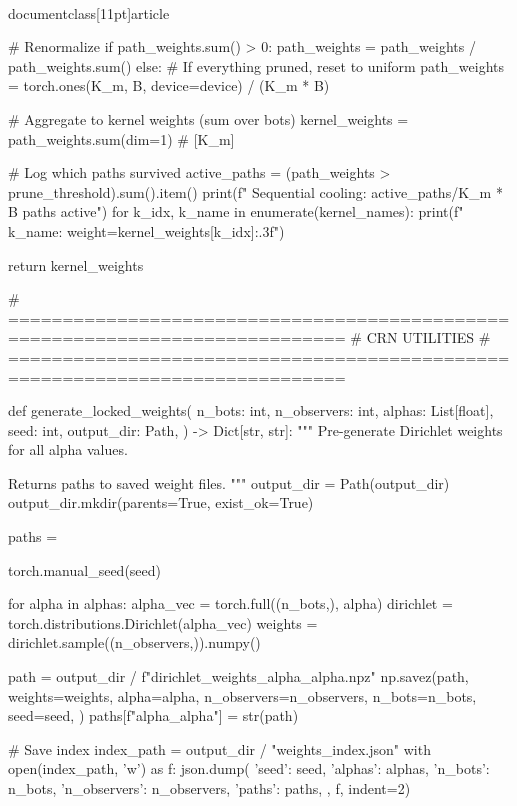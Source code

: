\\documentclass[11pt]{article}
\begin{document}
\begin{CodeBlock}
{{{{{{{{            # Renormalize
            if path_weights.sum() > 0:
                path_weights = path_weights / path_weights.sum()
            else:
                # If everything pruned, reset to uniform
                path_weights = torch.ones(K_m, B, device=device) / (K_m * B)
        
        # Aggregate to kernel weights (sum over bots)
        kernel_weights = path_weights.sum(dim=1)  # [K_m]
        
        # Log which paths survived
        active_paths = (path_weights > prune_threshold).sum().item()
        print(f"    Sequential cooling: {active_paths}/{K_m * B} paths active")
        for k_idx, k_name in enumerate(kernel_names):
            print(f"      {k_name}: weight={kernel_weights[k_idx]:.3f}")
        
        return kernel_weights


# =============================================================================
# CRN UTILITIES
# =============================================================================

def generate_locked_weights(
    n_bots: int,
    n_observers: int,
    alphas: List[float],
    seed: int,
    output_dir: Path,
) -> Dict[str, str]:
    """
    Pre-generate Dirichlet weights for all alpha values.
    
    Returns paths to saved weight files.
    """
    output_dir = Path(output_dir)
    output_dir.mkdir(parents=True, exist_ok=True)
    
    paths = {}
    
    torch.manual_seed(seed)
    
    for alpha in alphas:
        alpha_vec = torch.full((n_bots,), alpha)
        dirichlet = torch.distributions.Dirichlet(alpha_vec)
        weights = dirichlet.sample((n_observers,)).numpy()
        
        path = output_dir / f"dirichlet_weights_alpha_{alpha}.npz"
        np.savez(path, 
            weights=weights,
            alpha=alpha,
            n_observers=n_observers,
            n_bots=n_bots,
            seed=seed,
        )
        paths[f"alpha_{alpha}"] = str(path)
    
    # Save index
    index_path = output_dir / "weights_index.json"
    with open(index_path, 'w') as f:
        json.dump({
            'seed': seed,
            'alphas': alphas,
            'n_bots': n_bots,
            'n_observers': n_observers,
            'paths': paths,
        }, f, indent=2)
    
}}}}}}}}
\end{CodeBlock}
\end{document}
